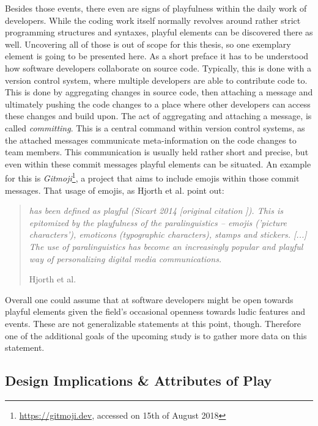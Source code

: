 Besides those events, there even are signs of playfulness within the daily work of developers. While the coding work itself normally revolves around rather strict programming structures and syntaxes, playful elements can be discovered there as well. Uncovering all of those is out of scope for this thesis, so one exemplary element is going to be presented here. As a short preface it has to be understood how software developers collaborate on source code. Typically, this is done with a version control system, where multiple developers are able to contribute code to. This is done by aggregating changes in source code, then attaching a message and ultimately pushing the code changes to a place where other developers can access these changes and build upon. The act of aggregating and attaching a message, is called \textit{committing}. This is a central command within version control systems, as the attached messages communicate meta-information on the code changes to team members. This communication is usually held rather short and precise, but even within these commit messages playful elements can be situated. An example for this is \textit{Gitmoji}\footnote{\url{https://gitmoji.dev}, accessed on 15th of August 2018}, a project that aims to include emojis within those commit messages. That usage of emojis, as Hjorth et al. point out:

\begin{quote}
  \textit{has been defined as playful (Sicart 2014 [original citation \cite{sicart2014play}]). This is epitomized by the playfulness of the paralinguistics -- emojis ('picture characters'), emoticons (typographic characters), stamps and stickers. [...] The use of paralinguistics has become an increasingly popular and playful way of personalizing digital media communications.}

  \footnotesize{Hjorth et al. \cite{hjorth2018beyond}}
\end{quote}

Overall one could assume that at software developers might be open towards playful elements given the field's occasional openness towards ludic features and events. These are not generalizable statements at this point, though. Therefore one of the additional goals of the upcoming study is to gather more data on this statement.

\subsection{Design Implications \& Attributes of Play}

